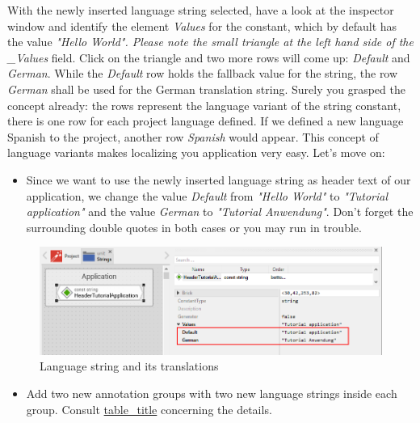 \documentclass[
  a4paper,
,tablecaptionabove
]{scrbook}
\begin{document}
With the newly inserted language string selected, have a look at the
inspector window and identify the element \emph{Values} for the
constant, which by default has the value \emph{"Hello World". Please
note the small triangle at the left hand side of the \_Values} field.
Click on the triangle and two more rows will come up: \emph{Default} and
\emph{German}. While the \emph{Default} row holds the fallback value for
the string, the row \emph{German} shall be used for the German
translation string. Surely you grasped the concept already: the rows
represent the language variant of the string constant, there is one row
for each project language defined. If we defined a new language Spanish
to the project, another row \emph{Spanish} would appear. This concept of
language variants makes localizing you application very easy. Let's move
on:

\begin{itemize}
\item
  Since we want to use the newly inserted language string as header text
  of our application, we change the value \emph{Default} from
  \emph{"Hello World"} to \emph{"Tutorial application"} and the value
  \emph{German} to \emph{"Tutorial Anwendung"}. Don't forget the
  surrounding double quotes in both cases or you may run in trouble.
\end{itemize}

\begin{figure}
\centering
\includegraphics{./../asciidoc/modules/ROOT/assets/images/localization/LanguageStrings.png}
\caption{Language string and its translations}
\end{figure}

\begin{itemize}
\item
  Add two new annotation groups with two new language strings inside
  each group. Consult
  \protect\hyperlink{tab:LanguageStrings}{table\_title} concerning the
  details.
\end{itemize}
\end{document}
